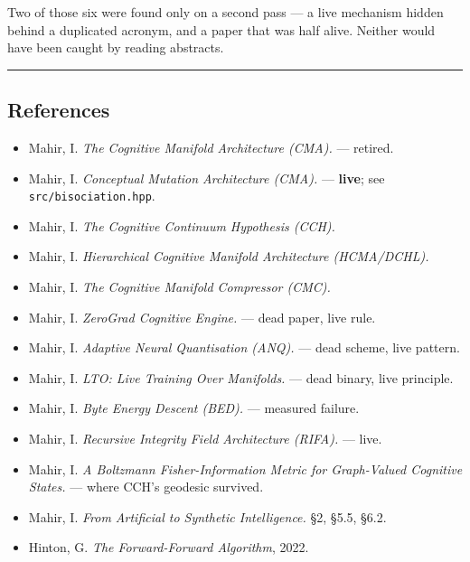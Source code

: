 \documentclass[
  11pt,
  a4paper,
]{article}
\providecommand{\tightlist}{%
  \setlength{\itemsep}{0pt}\setlength{\parskip}{0pt}}
\begin{document}
Two of those six were found only on a second pass --- a live mechanism
hidden behind a duplicated acronym, and a paper that was half alive.
Neither would have been caught by reading abstracts.

\begin{center}\rule{0.5\linewidth}{0.5pt}\end{center}

\subsection{References}\label{references}

\begin{itemize}
\tightlist
\item
  Mahir, I. \emph{The Cognitive Manifold Architecture (CMA).} ---
  retired.
\item
  Mahir, I. \emph{Conceptual Mutation Architecture (CMA).} ---
  \textbf{live}; see \texttt{src/bisociation.hpp}.
\item
  Mahir, I. \emph{The Cognitive Continuum Hypothesis (CCH).}
\item
  Mahir, I. \emph{Hierarchical Cognitive Manifold Architecture
  (HCMA/DCHL).}
\item
  Mahir, I. \emph{The Cognitive Manifold Compressor (CMC).}
\item
  Mahir, I. \emph{ZeroGrad Cognitive Engine.} --- dead paper, live rule.
\item
  Mahir, I. \emph{Adaptive Neural Quantisation (ANQ).} --- dead scheme,
  live pattern.
\item
  Mahir, I. \emph{LTO: Live Training Over Manifolds.} --- dead binary,
  live principle.
\item
  Mahir, I. \emph{Byte Energy Descent (BED).} --- measured failure.
\item
  Mahir, I. \emph{Recursive Integrity Field Architecture (RIFA).} ---
  live.
\item
  Mahir, I. \emph{A Boltzmann Fisher-Information Metric for Graph-Valued
  Cognitive States.} --- where CCH's geodesic survived.
\item
  Mahir, I. \emph{From Artificial to Synthetic Intelligence.} §2, §5.5,
  §6.2.
\item
  Hinton, G. \emph{The Forward-Forward Algorithm}, 2022.
\end{itemize}
\end{document}
